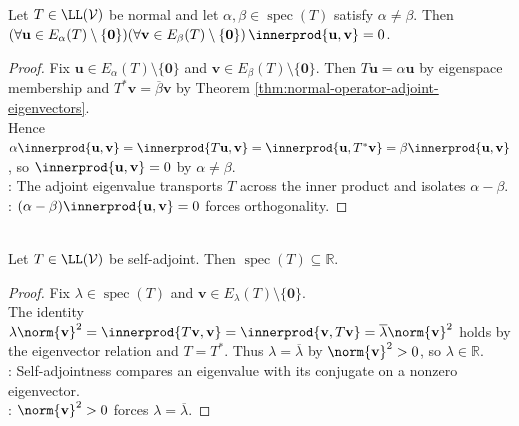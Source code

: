 \begin{theorem} \label{thm:normal-eigenvectors-distinct-eigenvalues-orthogonal} \\
Let $T\in\LL(\mathcal{V})$ be normal and let $\alpha,\beta\in\operatorname{spec}(T)$ satisfy $\alpha\neq\beta$. Then $(\forall\mathbf{u}\in E_{\alpha}(T)\setminus\{\mathbf{0}\})(\forall\mathbf{v}\in E_{\beta}(T)\setminus\{\mathbf{0}\})\,\innerprod{\mathbf{u},\mathbf{v}}=0$.
\begin{proof}
Fix $\mathbf{u}\in E_{\alpha}(T)\setminus\{\mathbf{0}\}$ and $\mathbf{v}\in E_{\beta}(T)\setminus\{\mathbf{0}\}$. Then $T\mathbf{u}=\alpha\mathbf{u}$ by eigenspace membership and $T^*\mathbf{v}=\overline{\beta}\mathbf{v}$ by Theorem \ref{thm:normal-operator-adjoint-eigenvectors}.\\
Hence $\alpha\innerprod{\mathbf{u},\mathbf{v}}=\innerprod{T\mathbf{u},\mathbf{v}}=\innerprod{\mathbf{u},T^*\mathbf{v}}=\beta\innerprod{\mathbf{u},\mathbf{v}}$, so $\innerprod{\mathbf{u},\mathbf{v}}=0$ by $\alpha\neq\beta$.\\
: The adjoint eigenvalue transports $T$ across the inner product and isolates $\alpha-\beta$.\\
: $(\alpha-\beta)\innerprod{\mathbf{u},\mathbf{v}}=0$ forces orthogonality.
\end{proof}
\end{theorem}

\begin{theorem} \label{thm:self-adjoint-eigenvalues-real} \\
Let $T\in\LL(\mathcal{V})$ be self-adjoint. Then $\operatorname{spec}(T)\subseteq\mathbb{R}$.
\begin{proof}
Fix $\lambda\in\operatorname{spec}(T)$ and $\mathbf{v}\in E_{\lambda}(T)\setminus\{\mathbf{0}\}$.\\
The identity $\lambda\norm{\mathbf{v}}^2=\innerprod{T\mathbf{v},\mathbf{v}}=\innerprod{\mathbf{v},T\mathbf{v}}=\overline{\lambda}\norm{\mathbf{v}}^2$ holds by the eigenvector relation and $T=T^*$. Thus $\lambda=\overline{\lambda}$ by $\norm{\mathbf{v}}^2>0$, so $\lambda\in\mathbb{R}$.\\
: Self-adjointness compares an eigenvalue with its conjugate on a nonzero eigenvector.\\
: $\norm{\mathbf{v}}^2>0$ forces $\lambda=\overline{\lambda}$.
\end{proof}
\end{theorem}


